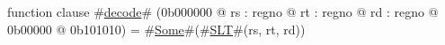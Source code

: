 function clause #\hyperref[zdecode]{decode}# (0b000000 @ rs : regno @ rt : regno @ rd : regno @ 0b00000 @ 0b101010) =
  #\hyperref[zSome]{Some}#(#\hyperref[zSLT]{SLT}#(rs, rt, rd))
